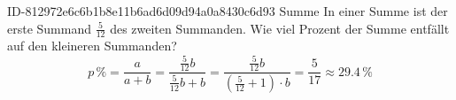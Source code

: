 \begin{exercise}
      {ID-812972e6c6b1b8e11b6ad6d09d94a0a8430c6d93}
      {Summe}
  \ifproblem\problem
    In einer Summe ist der erste Summand $\frac{5}{12}$ des zweiten Summanden.
    Wie viel Prozent der Summe entfällt auf den kleineren Summanden?
  \fi
  \ifoutcome\outcome
  \begin{equation*}
    p\,\text{\%}
    =\frac{a}{a+b}
    =\frac{\frac{5}{12}b}{\frac{5}{12}b+b}
    =\frac{\frac{5}{12}b}{\left(\frac{5}{12}+1\right)\cdot b}
    =\frac{5}{17}
    \approx\num{29.4}\,\text{\%}
  \end{equation*}
  \fi
\end{exercise}
